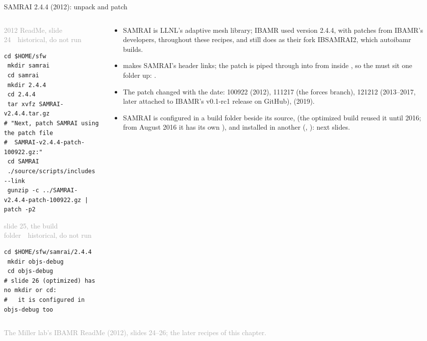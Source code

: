\documentclass[aspectratio=169,11pt]{beamer}
\newcommand{\sourcecredit}[1]{\vfill\begin{flushright}\tiny\textcolor{DarkGray}{#1}\end{flushright}}
\newcommand{\hist}[1]{{\tiny\sffamily\textcolor{DarkGray}{#1\ \textbullet\ historical, do not run}}\par\nointerlineskip\vspace{0.3mm}}
\begin{document}
\begin{frame}[fragile]{SAMRAI 2.4.4 (2012): unpack and patch}
\label{fr:samrai2012}
\begin{columns}[T,onlytextwidth]
\begin{column}{0.47\textwidth}
\hist{2012 ReadMe, slide 24}
\begin{lstlisting}[style=hist]
 cd $HOME/sfw
 mkdir samrai
 cd samrai
 mkdir 2.4.4
 cd 2.4.4
 tar xvfz SAMRAI-v2.4.4.tar.gz
# "Next, patch SAMRAI using the patch file
#  SAMRAI-v2.4.4-patch-100922.gz:"
 cd SAMRAI
 ./source/scripts/includes --link
 gunzip -c ../SAMRAI-v2.4.4-patch-100922.gz | patch -p2
\end{lstlisting}
\hist{slide 25, the build folder}
\begin{lstlisting}[style=hist]
 cd $HOME/sfw/samrai/2.4.4
 mkdir objs-debug
 cd objs-debug
# slide 26 (optimized) has no mkdir or cd:
#   it is configured in objs-debug too
\end{lstlisting}
\end{column}
\begin{column}{0.5\textwidth}
\scriptsize
\begin{itemize}\setlength{\itemsep}{2pt}
  \item SAMRAI is LLNL's adaptive mesh library; IBAMR used version 2.4.4, with patches from IBAMR's developers, throughout these recipes, and still does as their fork IBSAMRAI2, which autoibamr builds.
  \item {} makes SAMRAI's header links; the patch is piped through  into  from inside , so the  must sit one folder up: .
  \item The patch changed with the date: 100922 (2012), 111217 (the forces branch), 121212 (2013--2017, later attached to IBAMR's v0.1-rc1 release on GitHub),  (2019).
  \item SAMRAI is configured in a build folder beside its source,  (the optimized build reused it until 2016; from August 2016 it has its own ), and installed in another (, ): next slides.
\end{itemize}
\end{column}
\end{columns}
\sourcecredit{The Miller lab's IBAMR ReadMe (2012), slides 24--26; the later recipes of this chapter.}
\end{frame}
\end{document}
